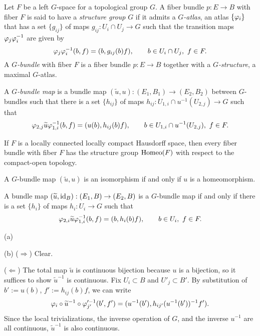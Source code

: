 \documentclass{../../large}
\begin{document}
\begin{prb}
Let $F$ be a left $G$-space for a topological group $G$.
A fiber bundle $p:E\to B$ with fiber $F$ is said to have a \emph{structure group} $G$ if it admits a \emph{$G$-atlas}, an atlas $\{\varphi_i\}$ that has a set $\{g_{ij}\}$ of maps $g_{ij}:U_i\cap U_j\to G$ such that the transition maps $\varphi_j\varphi_i^{-1}$ are given by
\[\varphi_j\varphi_i^{-1}(b,f)=(b,g_{ij}(b)f),
\qquad b\in U_i\cap U_j,\ f\in F.\]
A \emph{$G$-bundle} with fiber $F$ is a fiber bundle $p:E\to B$ together with a \emph{$G$-structure}, a maximal $G$-atlas.

A \emph{$G$-bundle map} is a bundle map $(\tilde u,u):(E_1,B_1)\to(E_2,B_2)$ between $G$-bundles such that there is a set $\{h_{ij}\}$ of maps $h_{ij}:U_{1,i}\cap u^{-1}(U_{2,j})\to G$ such that
\[\varphi_{2,j}\widetilde u\varphi_{1,i}^{-1}(b,f)=(u(b),h_{ij}(b)f),
\qquad b\in U_{1,i}\cap u^{-1}(U_{2,j}),\ f\in F.\]


\begin{parts}
\item If $F$ is a locally connected locally compact Hausdorff space, then every fiber bundle with fiber $F$ has the structure group $\operatorname{Homeo}(F)$ with respect to the compact-open topology.
\item A $G$-bundle map $(\tilde u,u)$ is an isomorphism if and only if $u$ is a homeomorphism.
\item A bundle map $(\widetilde u,\operatorname{id}_B):(E_1,B)\to(E_2,B)$ is a $G$-bundle map if and only if there is a set $\{h_i\}$ of maps $h_i:U_i\to G$ such that
\[\varphi_{2,i}\widetilde u\varphi_{1,i}^{-1}(b,f)=(b,h_i(b)f),
\qquad b\in U_i,\ f\in F.\]
\end{parts}
\end{prb}
\begin{pf}
(a)

(b)
($\Rightarrow$)
Clear.

($\Leftarrow$)
The total map $\tilde u$ is continuous bijection because $u$ is a bijection, so it suffices to show $\tilde u^{-1}$ is continuous.
Fix $U_i\subset B$ and $U'_j\subset B'$.
By substitution of $b':=u(b)$, $f':=h_{ij}(b)f$, we can write
\[\varphi_i\circ\widetilde u^{-1}\circ\varphi_{j'}'^{-1}(b',f')=(u^{-1}(b'),h_{ij'}(u^{-1}(b'))^{-1}f').\]
Since the local trivializations, the inverse operation of $G$, and the inverse $u^{-1}$ are all continuous, $\tilde u^{-1}$ is also continuous.
\end{pf}
\end{document}
